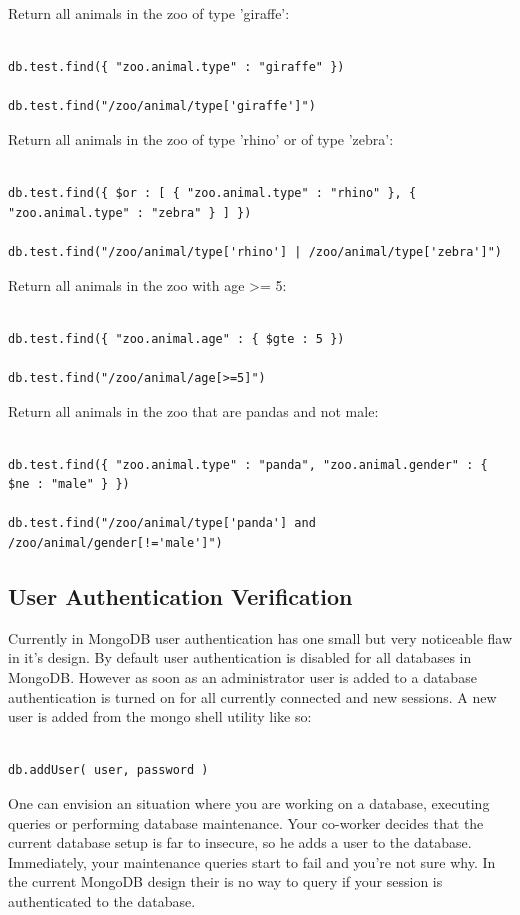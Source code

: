 \documentclass{../dependencies/acm_proc_article-sp}
\begin{document}
Return all animals in the zoo of type 'giraffe':
\begin{lstlisting}

db.test.find({ "zoo.animal.type" : "giraffe" })

db.test.find("/zoo/animal/type['giraffe']")
\end{lstlisting}

Return all animals in the zoo of type 'rhino' or of type 'zebra':
\begin{lstlisting}

db.test.find({ $or : [ { "zoo.animal.type" : "rhino" }, { "zoo.animal.type" : "zebra" } ] })

db.test.find("/zoo/animal/type['rhino'] | /zoo/animal/type['zebra']")
\end{lstlisting}

Return all animals in the zoo with age >= 5:
\begin{lstlisting}

db.test.find({ "zoo.animal.age" : { $gte : 5 })

db.test.find("/zoo/animal/age[>=5]")
\end{lstlisting}

Return all animals in the zoo that are pandas and not male:
\begin{lstlisting}

db.test.find({ "zoo.animal.type" : "panda", "zoo.animal.gender" : { $ne : "male" } })

db.test.find("/zoo/animal/type['panda'] and /zoo/animal/gender[!='male']")
\end{lstlisting}

\subsection{User Authentication Verification}
Currently in MongoDB user authentication has one small but very noticeable flaw in it's design.
By default user authentication is disabled for all databases in MongoDB. However as soon as an administrator
user is added to a database authentication is turned on for all currently connected and new sessions.
A new user is added from the mongo shell utility like so:
\begin{lstlisting}

db.addUser( user, password )
\end{lstlisting}

One can envision an situation where you are working on a database, executing queries
or performing database maintenance. Your co-worker decides that the current database setup
is far to insecure, so he adds a user to the database. Immediately, your maintenance queries
start to fail and you're not sure why. In the current MongoDB design their is no way
to query if your session is authenticated to the database.
\end{document}
